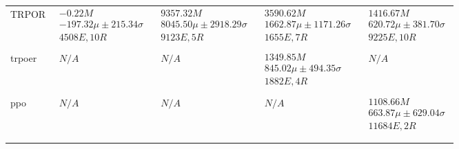 \begin{tabular}{|l|p{3.2cm}|p{3.2cm}|p{3.2cm}|p{3.2cm}|}
TRPOR & $\begin{array}{c} -0.22M \\ -197.32\mu \pm 215.34\sigma \\ 4508E, 10R \end{array}$ & $\begin{array}{c} 9357.32M \\ 8045.50\mu \pm 2918.29\sigma \\ 9123E, 5R \end{array}$ & $\begin{array}{c} 3590.62M \\ 1662.87\mu \pm 1171.26\sigma \\ 1655E, 7R \end{array}$ & $\begin{array}{c} 1416.67M \\ 620.72\mu \pm 381.70\sigma \\ 9225E, 10R \end{array}$ \\ \\ \hline
trpoer & $\begin{array}{c} N/A \end{array}$ & $\begin{array}{c} N/A \end{array}$ & $\begin{array}{c} 1349.85M \\ 845.02\mu \pm 494.35\sigma \\ 1882E, 4R \end{array}$ & $\begin{array}{c} N/A \end{array}$ \\ \\ \hline
ppo & $\begin{array}{c} N/A \end{array}$ & $\begin{array}{c} N/A \end{array}$ & $\begin{array}{c} N/A \end{array}$ & $\begin{array}{c} 1108.66M \\ 663.87\mu \pm 629.04\sigma \\ 11684E, 2R \end{array}$ \\ \\ \hline
\bottomrule \\ \hline
\end{tabular}
